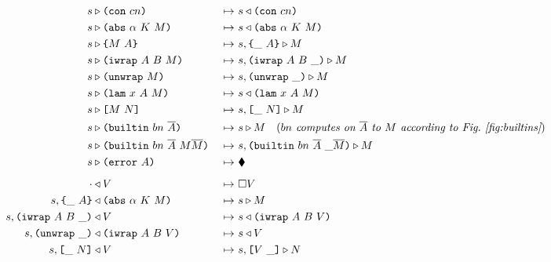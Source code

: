 \documentclass[../plutus-core-specification.tex]{subfiles}
\begin{document}
\begin{figure}[H]
\begin{subfigure}[c]{\linewidth}
\hspace{-1cm}\begin{minipage}{\linewidth}
\begin{alignat*}{2}
  s & \compute \con{cn}                     &~\mapsto~&  s \return \con{cn}\\
  s & \compute \abs{\alpha}{K}{M}           &~\mapsto~&  s \return \abs{\alpha}{K}{M}\\
  s & \compute \inst{M}{A}                  &~\mapsto~&  s,\inInstLeftFrame{A} \compute M\\
  s & \compute \wrap{A}{B}{M}               &~\mapsto~&  s,\inWrapRightFrame{A}{B} \compute M\\
  s & \compute \unwrap{M}                   &~\mapsto~&  s,\inUnwrapFrame{} \compute M\\
  s & \compute \lam{x}{A}{M}                &~\mapsto~&  s \return \lam{x}{A}{M}\\
  s & \compute \app{M}{N}                   &~\mapsto~&  s,\inAppLeftFrame{N} \compute M\\
  s & \compute \builtin{bn}{\repetition{A}}{\!\!}
                                            &~\mapsto~&  s \compute M
                                            \quad (\textit{$bn$ computes on $\repetition{A}$ to $M$ according to Fig.~\ref{fig:builtins}})\\
  s & \compute \builtin{bn}{\repetition{A}}{M \repetition{M}}
                                            &~\mapsto~&  s,\inBuiltin{bn}{\repetition{A}}{}{\_}{\repetition{M}} \compute M\\
  s & \compute \error{A}                    &~\mapsto~&  \ckerror{}\\
  \\[-10pt] %
  \cdot& \return V                          &~\mapsto~&  \square V\\
  s,\inInstLeftFrame{A} & \return \abs{\alpha}{K}{M}
                                            &~\mapsto~&  s \compute M\\
  s,\inWrapRightFrame{A}{B} & \return V     &~\mapsto~&  s \return \wrap{A}{B}{V}\\
  s,\inUnwrapFrame{} & \return \wrap{A}{B}{V}
                                            &~\mapsto~&  s \return V\\
  s,\inAppLeftFrame{N} & \return V          &~\mapsto~&  s,\inAppRightFrame{V} \compute N\\

\end{alignat*}
\end{minipage}
\end{subfigure}
\end{figure}
\end{document}
